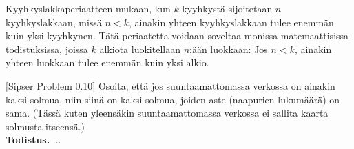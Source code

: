 \documentclass[12pt,a4paper]{article}
\begin{document}
\pagebreak
{}
Kyyhkyslakkaperiaatteen mukaan, kun $k$ kyyhkystä sijoitetaan $n$ kyyhkyslakkaan, missä $n<k$, ainakin yhteen kyyhkyslakkaan tulee enemmän kuin yksi kyyhkynen. Tätä periaatetta voidaan soveltaa monissa matemaattisissa todistuksissa, joissa $k$ alkiota luokitellaan $n$:ään luokkaan: Jos $n<k$, ainakin yhteen luokkaan tulee enemmän kuin yksi alkio.
  
{[Sipser Problem 0.10]}
Osoita, että jos suuntaamattomassa verkossa on ainakin kaksi solmua,
niin siinä on kaksi solmua, joiden aste (naapurien lukumäärä)
on sama.
(Tässä kuten yleensäkin suuntaamattomassa verkossa ei
sallita kaarta solmusta itseensä.)\\



\medskip\noindent
\textbf{Todistus.}
...
\end{document}
